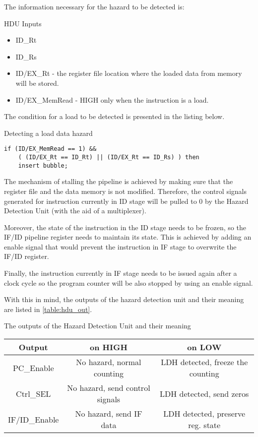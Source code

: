\documentclass[a4paper,12pt]{report}
\begin{document}
The information necessary for the hazard to be detected is:
\begin{my-list}{HDU Inputs}
    \begin{itemize}
        \item ID\_Rt
        \item ID\_Rs
        \item ID/EX\_Rt - the register file location where the loaded data from memory will be stored.
        \item ID/EX\_MemRead - HIGH only when the instruction is a load.
    \end{itemize}
\end{my-list}

The condition for a load to be detected is presented in the listing below.

\begin{my-listing}{Detecting a load data hazard}
\begin{lstlisting}[style=vhdl]
if (ID/EX_MemRead == 1) && 
    ( (ID/EX_Rt == ID_Rt) || (ID/EX_Rt == ID_Rs) ) then
    insert bubble;
    \end{lstlisting}
\end{my-listing}

The mechanism of stalling the pipeline is achieved by making sure that the register file and the data memory is not modified. Therefore, the control signals generated for instruction currently in ID stage will be pulled to 0 by the Hazard Detection Unit (with the aid of a multiplexer). 

Moreover, the state of the instruction in the ID stage needs to be frozen, so the IF/ID pipeline register needs to maintain its state. This is achieved by adding an enable signal that would prevent the instruction in IF stage to overwrite the IF/ID register. 

Finally, the instruction currently in IF stage needs to be issued again after a clock cycle so the program counter will be also stopped by using an enable signal.

With this in mind, the outputs of the hazard detection unit and their meaning are listed in \ref{table:hdu_out}.

\begin{my-table}{The outputs of the Hazard Detection Unit and their meaning}
    \centering
    \begin{tabular}{|c|c|c|}
        \hline
        \textbf{Output} & \textbf{on HIGH} & \textbf{on LOW}\\
         \hline
         PC\_Enable & No hazard, normal counting & LDH detected, freeze the counting\\
        \hline
         Ctrl\_SEL & No hazard, send control signals & LDH detected, send zeros \\
        \hline
         IF/ID\_Enable & No hazard, send IF data & LDH detected, preserve reg. state  \\
        \hline
    \end{tabular}
    \label{table:hdu_out}
\end{my-table}
\end{document}

